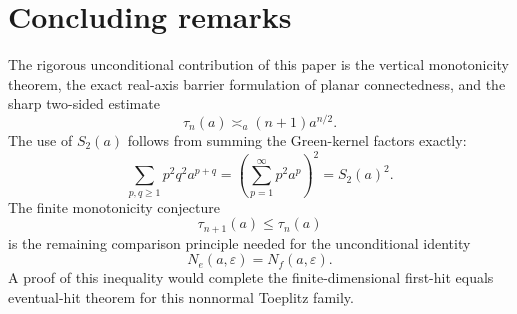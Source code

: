 \documentclass[11pt]{amsart}
\numberwithin{equation}{section}
\newcommand{\eps}{\varepsilon}
\begin{document}
\section{Concluding remarks}

The rigorous unconditional contribution of this paper is the vertical monotonicity theorem, the exact real-axis barrier formulation of planar connectedness, and the sharp two-sided estimate
\[
\tau_n(a)\asymp_a (n+1)a^{n/2}.
\]
The use of \(S_2(a)\) follows from summing the Green-kernel factors exactly:
\[
\sum_{p,q\ge1}p^2q^2a^{p+q}
=
\left(\sum_{p=1}^{\infty}p^2a^p\right)^2
=
S_2(a)^2.
\]
The finite monotonicity conjecture
\[
\tau_{n+1}(a)\le\tau_n(a)
\]
is the remaining comparison principle needed for the unconditional identity
\[
N_e(a,\eps)=N_f(a,\eps).
\]
A proof of this inequality would complete the finite-dimensional first-hit equals eventual-hit theorem for this nonnormal Toeplitz family.
\end{document}
